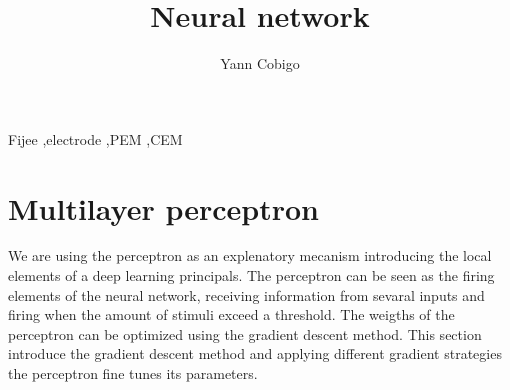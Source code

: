 \documentclass[final, paper=letter,5p,times,twocolumn]{elsarticle}
\begin{document}
\begin{frontmatter}

\title{Neural network}

\author[label1]{Yann Cobigo}
\address[label1]{University of California, San Francisco | ucsf.edu}




\begin{abstract}
\end{abstract}

\begin{keyword}
Fijee \sep electrode \sep PEM \sep CEM
\end{keyword}

\end{frontmatter}



\section{Multilayer perceptron}

We are using the perceptron as an explenatory mecanism introducing the local elements of a deep learning principals. The perceptron can be seen as the firing elements of the neural network, receiving information from sevaral inputs and firing when the amount of stimuli exceed a threshold. The weigths of the perceptron can be optimized using the gradient descent method. This section introduce the gradient descent method and applying different gradient strategies the perceptron fine tunes its parameters.
\end{document}
